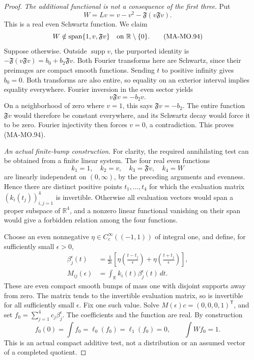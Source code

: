 \begin{proof}
\emph{The additional functional is not a consequence of the first three.}
Put
\[
                      W=Lv=v-v^2-\mathfrak F(v\mathfrak Fv).
 \tag{MA-MO.93}
\]
This is a real even Schwartz function. We claim
\[
                  W\notin\operatorname{span}\{1,v,\mathfrak Fv\}
                  \quad\hbox{on }\mathbb R\setminus\{0\}.
 \tag{MA-MO.94}
\]
Suppose otherwise. Outside \(\operatorname{supp}v\), the
purported identity is
\(-\mathfrak F(v\mathfrak Fv)=b_0+b_2\mathfrak Fv\).
Both Fourier transforms here are Schwartz, since their
preimages are compact smooth functions. Sending \(t\) to
positive infinity gives \(b_0=0\). Both transforms are also
entire, so equality on an exterior interval implies equality
everywhere. Fourier inversion in the even sector yields
\[
                         v\mathfrak Fv=-b_2v.
 \tag{MA-MO.95}
\]
On a neighborhood of zero where \(v=1\), this says
\(\mathfrak Fv=-b_2\). The entire function \(\mathfrak Fv\)
would therefore be constant everywhere, and its Schwartz
decay would force it to be zero. Fourier injectivity then
forces \(v=0\), a contradiction. This proves (MA-MO.94).

\emph{An actual finite-bump construction.}
For clarity, the required annihilating test can be obtained
from a finite linear system. The four real even functions
\[
                   k_1=1,\quad k_2=v,\quad
                   k_3=\mathfrak Fv,\quad k_4=W
 \tag{MA-MO.96}
\]
are linearly independent on \((0,\infty)\), by the preceding
arguments and evenness. Hence there are distinct positive
points \(t_1,\ldots,t_4\) for which the evaluation matrix
\((k_i(t_j))_{i,j=1}^4\) is invertible. Otherwise all evaluation
vectors would span a proper subspace of \(\mathbb R^4\),
and a nonzero linear functional vanishing on their span
would give a forbidden relation among the four functions.

Choose an even nonnegative \(\eta\in C_c^\infty((-1,1))\)
of integral one, and define, for sufficiently small \(\epsilon>0\),
\[
 \begin{aligned}
 \beta_j^\epsilon(t)
   &=\frac{1}{2\epsilon}
       \left[\eta\left(\frac{t-t_j}{\epsilon}\right)
              +\eta\left(\frac{t+t_j}{\epsilon}\right)\right],\\
 M_{ij}(\epsilon)&=\int_{\mathbb R}k_i(t)\beta_j^\epsilon(t)\,dt.
 \end{aligned}
 \tag{MA-MO.97}
\]
These are even compact smooth bumps of mass one with disjoint
supports away from zero. The matrix tends to the invertible
evaluation matrix, so is invertible for all sufficiently
small \(\epsilon\). Fix one such value. Solve
\(M(\epsilon)c=(0,0,0,1)^{\mathsf T}\), and set
\(f_0=\sum_{j=1}^4c_j\beta_j^\epsilon\). The coefficients
and the function are real. By construction
\[
 f_0(0)=\int f_0=\ell_0(f_0)=\ell_1(f_0)=0,
                         \qquad \int Wf_0=1.
 \tag{MA-MO.98}
\]
This is an actual compact additive test, not a distribution
or an assumed vector of a completed quotient.


\end{proof}
